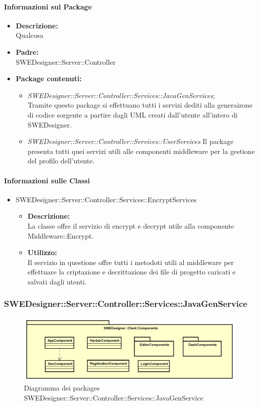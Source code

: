 		\paragraph{Informazioni sul Package}
		\begin{itemize}
			\item \textbf{Descrizione: }\\
			Qualcosa
			\item \textbf{Padre: }\\ SWEDesigner::Server::Controller
			\item \textbf{Package contenuti: }
			\begin{itemize}
				\item \emph{SWEDesigner::Server::Controller::Services::JavaGenServices};\\
				Tramite questo package si effettuano tutti i servizi dediti alla generaizone di codice sorgente a partire dagli UML creati dall'utente
				all'intero di SWEDesigner.
				\item \emph{SWEDesigner::Server::Controller::Services::UserServices}
				Il package presenta tutti quei servizi utili alle componenti middleware per la gestione del profilo dell'utente.
			\end{itemize}
		\end{itemize}
		\paragraph{Informazioni sulle Classi}
		\begin{itemize}
			\item SWEDesigner::Server::Controller::Services::EncryptServices
			\begin{itemize}
				\item \textbf{Descrizione: }\\
				La classe offre il servizio di encrypt e decrypt utile alla componente Middleware::Encrypt.
				\item \textbf{Utilizzo: }\\
				Il servizio in questione offre tutti i metodoti utili al middleware per effettuare la criptazione e decrittazione dei file di progetto caricati e salvati dagli utenti.
			\end{itemize}
		\end{itemize}

		\subsubsection{SWEDesigner::Server::Controller::Services::JavaGenService}
		\begin{figure}[h!]
		\centering
		\includegraphics[scale=0.4]{Disegnetti/SWEDesigner__Client_Components.png}
		\caption{Diagramma dei packages SWEDesigner::Server::Controller::Services::JavaGenService}
 		\end{figure}
